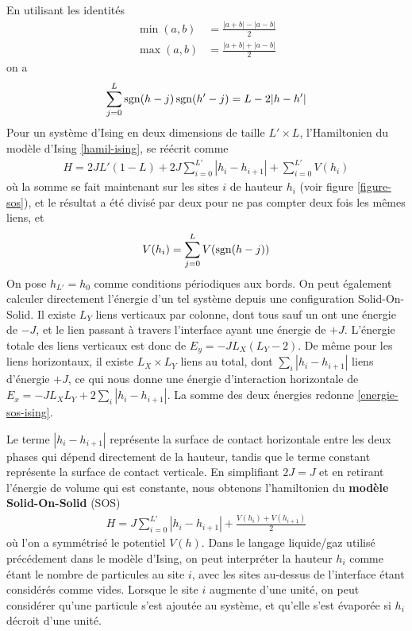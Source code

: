 En utilisant les identités
\begin{align}
     \min(a,b) &= \frac{|a+b| - |a-b|}{2} \\
    \max(a,b) &=    \frac{|a+b| + |a-b|}{2}
\end{align}
on a
\begin{align}
    \sum_{j=0}^L \operatorname{sgn}(h-j)\operatorname{sgn}(h'-j) = L - 2 |h-h'|
\end{align}
Pour un système d'Ising en deux dimensions de taille $L'\times L$, l'Hamiltonien du modèle d'Ising \ref{hamil-ising}, se réécrit comme 
\begin{align}
    H = 2 J L' (1-L) +2 J \sum_{i=0}^{L'} |h_i-h_{i+1}| + \sum_{i=0}^{L'} V(h_i)
    \label{energie-sos-ising}
\end{align}
où la somme se fait maintenant sur les sites $i$ de hauteur $h_i$ (voir figure \ref{figure-sos}), et le résultat a été divisé par deux pour ne pas compter deux fois les mêmes liens, et 
\begin{align}
    V(h_i) = \sum_{j=0}^L V(\operatorname{sgn}(h-j))
\end{align}
On pose $h_{L'}=h_0$ comme conditions périodiques aux bords.
On peut également calculer directement l'énergie d'un tel système depuis une configuration Solid-On-Solid. Il existe $ L_Y$ liens verticaux par colonne, dont tous sauf un ont une énergie de $-J$, et le lien passant à travers l'interface ayant une énergie de $+J$. L'énergie totale des liens verticaux est donc de $E_y = - J L_X ( L_Y-2)$. De même pour les liens horizontaux, il existe $L_X \times L_Y$ liens au total, dont $\sum_i |h_i-h_{i+1}|$ liens d'énergie $+J$, ce qui nous donne une énergie d'interaction horizontale de $E_x = - J L_X L_Y + 2 \sum_i |h_i-h_{i+1}|$. La somme des deux énergies redonne \ref{energie-sos-ising}.

Le terme $|h_i-h_{i+1}|$ représente la surface de contact horizontale entre les deux phases qui dépend directement de la hauteur, tandis que le terme constant représente la surface de contact verticale.
En simplifiant $2 J = J$ et en retirant l'énergie de volume qui est constante, nous obtenons l'hamiltonien du \textbf{modèle Solid-On-Solid} (SOS)
\begin{align}
    H = J \sum_{i=0}^{L'} |h_i-h_{i+1}| + \frac{V(h_i)+V(h_{i+1})}{2}
    \label{hamil-sos}
\end{align}
où l'on a symmétrisé le potentiel $V(h)$.
Dans le langage liquide/gaz utilisé précédement dans le modèle d'Ising, on peut interpréter la hauteur $h_i$ comme étant le nombre de particules au site $i$, avec les sites au-dessus de l'interface étant considérés comme vides. Lorsque le site $i$ augmente d'une unité, on peut considérer qu'une particule s'est ajoutée au système, et qu'elle s'est évaporée si $h_i$ décroit d'une unité. 

